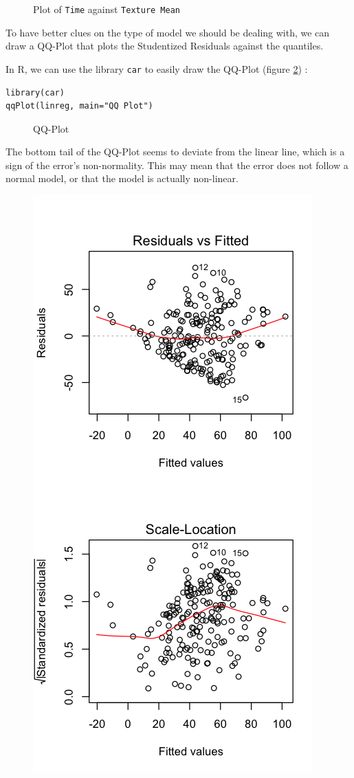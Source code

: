 \documentclass[]{report}
\newcommand{\inputtikz}[2]{%
	\scalebox{#1}{}  
}
\begin{document}
\begin{figure}[!h]
	\centering
	\inputtikz{0.5}{Figures/time_feature_ex1.tex}
	\caption{Plot of \texttt{Time} against \texttt{Texture Mean} }
	\label{fig:time_feature_ex1}
\end{figure}

To have better clues on the type of model we should be dealing with, we can draw a QQ-Plot that plots the Studentized Residuals against the quantiles. 

In R, we can use the library \texttt{car} to easily draw the QQ-Plot (figure \ref{fig:qq_plot}) :
\begin{lstlisting}
library(car)
qqPlot(linreg, main="QQ Plot")
\end{lstlisting}

\begin{figure}[!hb]
	\centering
	\inputtikz{0.5}{Figures/qq_plot.tex}
	\caption{QQ-Plot}
	\label{fig:qq_plot}
\end{figure}

The bottom tail of the QQ-Plot seems to deviate from the linear line, which is a sign of the error's non-normality. This may mean that the error does not follow a normal model, or that the model is actually non-linear.

\begin{figure}[!hb]
	\centering
	\includegraphics[width=0.5\linewidth]{Figures/fitted_value_plots}
	\caption{}
	\label{fig:fitted_value_plots}
\end{figure}
\end{document}
